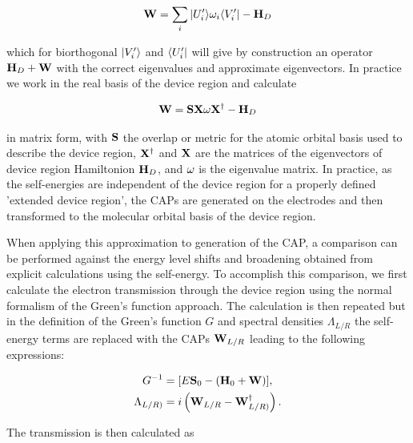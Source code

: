 \begin{equation}
    \mathbf{W} = \sum_i  |U^\prime_i \rangle \omega_i \langle V^\prime_i| - \mathbf{H}_D
    \label{eq:capsdefUV}
\end{equation}

which for biorthogonal $|V^\prime_i \rangle$ and $\langle U^\prime_i|$ will give by
construction an operator $\mathbf{H}_D + \mathbf{W}$ with the correct eigenvalues
and approximate eigenvectors. In practice we work in the real basis of the
device region and calculate

\begin{equation}
    \mathbf{W} = \mathbf{S} \mathbf{X} \mathbf{\omega}\mathbf{X}^\dagger - \mathbf{H}_D
    \label{eq:capsdefX}
\end{equation}

in matrix form, with $\mathbf{S}$ the overlap or metric for the atomic
orbital basis used to describe the device region, $\mathbf{X}^\dagger$ and
$\mathbf{X}$ are the matrices of the eigenvectors of device region
Hamiltonion $\mathbf{H}_D$, and $\mathbf{\omega}$ is the eigenvalue matrix. In
practice, as the self-energies are independent of the device region for
a properly defined 'extended device region', the \acp{CAP} are generated
on the electrodes and then transformed to the molecular orbital basis of
the device region.


When applying this approximation to generation of the \ac{CAP}, a
comparison can be performed against the energy level shifts and broadening
obtained from explicit calculations using the self-energy. To accomplish
this comparison, we first calculate the electron transmission through
the device region using the normal formalism of the Green's function
approach. The calculation is then repeated but in the definition of the
Green's function $G$ and spectral densities $\Lambda_{L/R}$ the
self-energy terms are replaced with the \acp{CAP} $\mathbf{W}_{L/R}$ leading
to the following expressions:

\begin{subequations}
  \begin{align}
    G^{-1} &= [E\mathbf{S}_0 - (\mathbf{H}_0 + \mathbf{W})], \\
    \Lambda_{L/R)} &= i \left( \mathbf{W}_{L/R} - \mathbf{W}^\dagger_{L/R)}
    \right).
  \end{align}
  \label{eq:glambdadef}
\end{subequations}

The transmission is then calculated as

